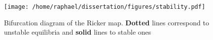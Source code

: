 \documentclass{report}
\begin{document}
\begin{figure}[htb]
	\centering
	\texttt{[image: /home/raphael/dissertation/figures/stability.pdf]}
	\caption{Bifurcation diagram of the Ricker map. \textbf{Dotted} lines correspond to unstable equilibria and \textbf{solid} lines to stable ones}
	\label{fig:qq}
\end{figure}
	
	
	{}
\end{document}
